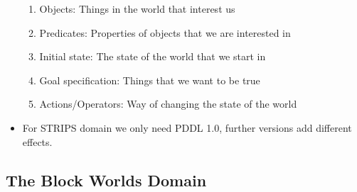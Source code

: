 \documentclass[a4paper]{article}
\begin{document}
\begin{itemize}
\begin{enumerate}
        \item Objects: Things in the world that interest us
        \item Predicates: Properties of objects that we are interested in
        \item Initial state: The state of the world that we start in
        \item Goal specification: Things that we want to be true
        \item Actions/Operators: Way of changing the state of the world
    \end{enumerate}
    \item For STRIPS domain we only need PDDL 1.0, further versions add different effects.
\end{itemize}

\subsection{The Block Worlds Domain}
\end{document}
